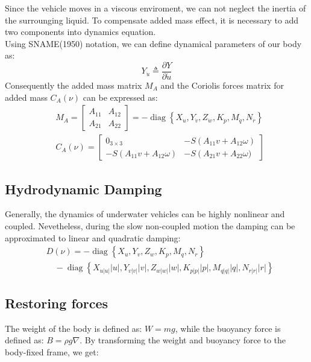     Since the vehicle moves in a viscous enviroment, we can not neglect the inertia of the surrounging liquid.
    To compensate added mass effect, it is necessary to add two components into dynamics equation.\\
    Using SNAME(1950) notation, we can define dynamical parameters of our body as:
    $$
    Y_{\dot{u}} \triangleq \frac{\partial Y}{\partial \dot{u}}
    $$
    Consequently the added mass matrix $M_A$ and 
    the Coriolis forces matrix for added mass $C_A(\nu)$
    can be expressed as: 
    $$
    \begin{aligned}
        & M_A=\left[\begin{array}{cc}
            A_{11} & A_{12} \\
            A_{21} & A_{22}
            \end{array}\right]=-\operatorname{diag}\left\{X_{\dot{u}}, Y_{\dot{v}}, Z_{\dot{w}}, K_{\dot{p}}, M_{\dot{q}}, N_{\dot{r}}\right\} \\
        & C_A(\nu)=\left[\begin{array}{cc}
        0_{3 \times 3} & -S\left(A_{11} v+A_{12} \omega\right) \\
        -S\left(A_{11} v+A_{12} \omega\right) & -S\left(A_{21} v+A_{22} \omega)\right.
        \end{array}\right]
    \end{aligned}
    $$

\subsection*{Hydrodynamic Damping}

    Generally, the dynamics of underwater vehicles can be highly nonlinear and coupled.
    Nevetheless, during the slow non-coupled motion the damping can be approximated to linear and quadratic damping:
    $$\begin{aligned}
        & D(\nu)=-\operatorname{diag}\left\{X_u, Y_v, Z_w, K_p, M_q, N_r\right\} \\
        & \quad-\operatorname{diag}\left\{X_{u|u|}|u|, Y_{v|v|}|v|, Z_{w|w|}|w|, K_{p|p|}|p|, M_{q|q|}|q|, N_{r|r|}|r|\right\}
    \end{aligned}
    $$

\subsection*{Restoring forces}
The weight of the body is defined as: $W=m g$, 
while the buoyancy force is defined as: $B=\rho g \nabla$. 
By transforming the weight and buoyancy force to the body-fixed frame, we get:


